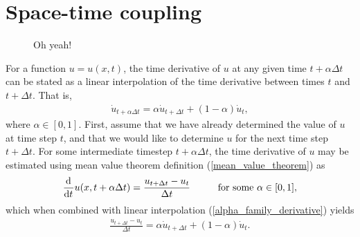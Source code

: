 
\chapter{Space-time coupling} \label{ssn_time_dependent_problems}

\begin{figure}
  \centering
    \def\svgwidth{\linewidth}
    
  \caption[$\alpha$-family of time derivative approximation]{Oh yeah!}
  \label{alpha_family_image}
\end{figure}

For a function $u = u(x,t)$, the time derivative of $u$ at any given time $t+\alpha \Delta t$ can be stated as a linear interpolation of the time derivative between times $t$ and $t + \Delta t$.  That is,
\begin{align}
  \label{alpha_family_derivative}
  \dot{u}_{t + \alpha \Delta t} = \alpha \dot{u}_{t + \Delta t} + (1-\alpha) \dot{u}_t,
\end{align}
where $\alpha \in [0,1]$.  First, assume that we have already determined the value of $u$ at time step $t$, and that we would like to determine $u$ for the next time step $t + \Delta t$.  For some intermediate timestep $t + \alpha \Delta t$, the time derivative of $u$ may be estimated using mean value theorem definition (\ref{mean_value_theorem})  as
\begin{align*}
  \totder{}{t} u(x,t + \alpha \Delta t) = \frac{u_{t + \Delta t} - u_t}{\Delta t} \hspace{10mm} \text{for some $\alpha \in [0,1]$},
\end{align*}
which when combined with linear interpolation (\ref{alpha_family_derivative}) yields 
\begin{align}
  \label{generalized_time_derivative}
  \frac{u_{t + \Delta t} - u_t}{\Delta t} = \alpha \dot{u}_{t + \Delta t} + (1-\alpha) \dot{u}_t.
\end{align}

